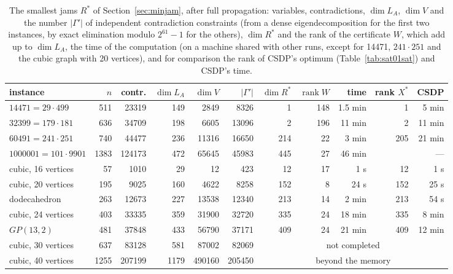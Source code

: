 \documentclass[11pt]{article}
\theoremstyle{definition}
\theoremstyle{remark}
\DeclareMathOperator{\rank}{rank}
\begin{document}
\begin{table}[ht]
\begin{center}
\small
\setlength\tabcolsep{2.5pt}
\begin{tabular}{|l|r|r|r|r|r|r|r|r|r|r|}
\hline
instance & $n$ & contr. & $\dim L_A$ & $\dim V$ & $|\Gamma'|$ & $\dim R^*$ & $\rank W$ & time & rank $X^*$ & CSDP \\
\hline
$14471=29\cdot499$      & 511  & 23319  & 149  & 2849   & 8326   & 1   & 148 & 1.5 min & 1  & 5 min \\
$32399=179\cdot181$     & 636  & 34709  & 198  & 6605   & 13096  & 2   & 196 & 11 min & 2   & 11 min \\
$60491=241\cdot251$     & 740  & 44477  & 236  & 11316  & 16650  & 214 & 22  & 3 min  & 205 & 21 min \\
$1000001=101\cdot9901$  & 1383 & 124173 & 472  & 65645  & 45983  & 445 & 27  & 46 min &     & --- \\
\hline
cubic, 16 vertices      & 57   & 1010   & 29   & 12     & 423    & 12  & 17  & 1 s    & 12  & 1 s \\
cubic, 20 vertices      & 195  & 9025   & 160  & 4622   & 8258   & 152 & 8   & 24 s   & 152 & 25 s \\
dodecahedron            & 263  & 12673  & 227  & 13538  & 12340  & 213 & 14  & 2 min  & 213 & 54 s \\
cubic, 24 vertices      & 403  & 33335  & 359  & 31900  & 32720  & 335 & 24  & 18 min & 335 & 8 min \\
$GP(13,2)$              & 481  & 37848  & 433  & 56790  & 37171  & 409 & 24  & 21 min & 409 & 12 min \\
cubic, 30 vertices      & 637  & 83128  & 581  & 87002  & 82069  & \multicolumn{5}{c|}{not completed} \\
cubic, 40 vertices      & 1255 & 207199 & 1179 & 490160 & 205450 & \multicolumn{5}{c|}{beyond the memory} \\
\hline
\end{tabular}
\end{center}
\caption{\label{tab:minjam} The smallest jams $R^*$ of
Section~\ref{sec:minjam}, after full propagation: variables,
contradictions, $\dim L_A$, $\dim V$ and the number $|\Gamma'|$ of
independent contradiction constraints (from a dense eigendecomposition for
the first two instances, by exact elimination modulo $2^{61}-1$ for the
others), $\dim R^*$ and the rank of the certificate $W$, which add up to
$\dim L_A$, the time of the computation (on a machine shared with other
runs, except for 14471, $241\cdot251$ and the cubic graph with 20
vertices), and for comparison the rank of CSDP's optimum
(Table~\ref{tab:sat01sat}) and CSDP's time.}
\end{table}
\end{document}
